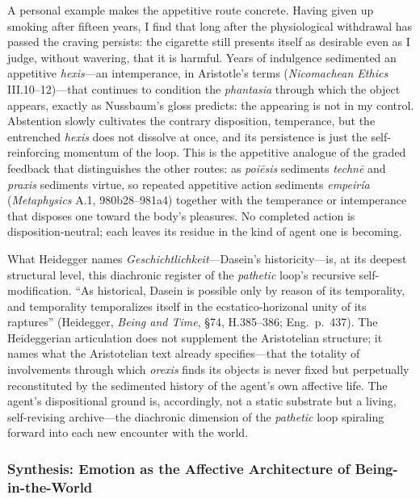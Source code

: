 A personal example makes the appetitive route concrete. Having given up smoking after fifteen years, I find that long after the physiological withdrawal has passed the craving persists: the cigarette still presents itself as desirable even as I judge, without wavering, that it is harmful. Years of indulgence sedimented an appetitive \textit{hexis}---an intemperance, in Aristotle's terms (\textit{Nicomachean Ethics} III.10--12)---that continues to condition the \textit{phantasia} through which the object appears, exactly as Nussbaum's gloss predicts: the appearing is not in my control. Abstention slowly cultivates the contrary disposition, temperance, but the entrenched \textit{hexis} does not dissolve at once, and its persistence is just the self-reinforcing momentum of the loop. This is the appetitive analogue of the graded feedback that distinguishes the other routes: as \textit{poiēsis} sediments \textit{technē} and \textit{praxis} sediments virtue, so repeated appetitive action sediments \textit{empeiría} (\textit{Metaphysics} A.1, 980b28--981a4) together with the temperance or intemperance that disposes one toward the body's pleasures. No completed action is disposition-neutral; each leaves its residue in the kind of agent one is becoming.

What Heidegger names \textit{Geschichtlichkeit}---Dasein's historicity---is, at its deepest structural level, this diachronic register of the \textit{pathetic} loop's recursive self-modification. ``As historical, Dasein is possible only by reason of its temporality, and temporality temporalizes itself in the ecstatico-horizonal unity of its raptures'' (Heidegger, \textit{Being and Time}, \S 74, H.385--386; Eng.~p.~437). The Heideggerian articulation does not supplement the Aristotelian structure; it names what the Aristotelian text already specifies---that the totality of involvements through which \textit{orexis} finds its objects is never fixed but perpetually reconstituted by the sedimented history of the agent's own affective life. The agent's dispositional ground is, accordingly, not a static substrate but a living, self-revising archive---the diachronic dimension of the \textit{pathetic} loop spiraling forward into each new encounter with the world.


\subsubsection*{Synthesis: Emotion as the Affective Architecture of Being-in-the-World}

